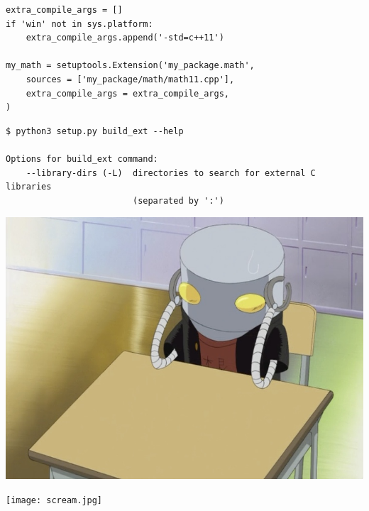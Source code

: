 \documentclass[pdf]{beamer}
\begin{document}
\begin{frame}[fragile]
    \begin{verbatim}
extra_compile_args = []
if 'win' not in sys.platform:
    extra_compile_args.append('-std=c++11')

my_math = setuptools.Extension('my_package.math',
    sources = ['my_package/math/math11.cpp'],
    extra_compile_args = extra_compile_args,
)
    \end{verbatim}
\end{frame}

\begin{frame}[fragile]
    \begin{verbatim}
$ python3 setup.py build_ext --help

Options for build_ext command:
    --library-dirs (-L)  directories to search for external C libraries
                         (separated by ':')
    \end{verbatim}
\end{frame}

\begin{frame}
    \begin{center}
        \includegraphics[height = 0.8\textheight]{mechazawa-sad.jpg}
    \end{center}
\end{frame}

\begin{frame}
    \begin{center}
        \texttt{[image: scream.jpg]}
    \end{center}
\end{frame}
\end{document}
